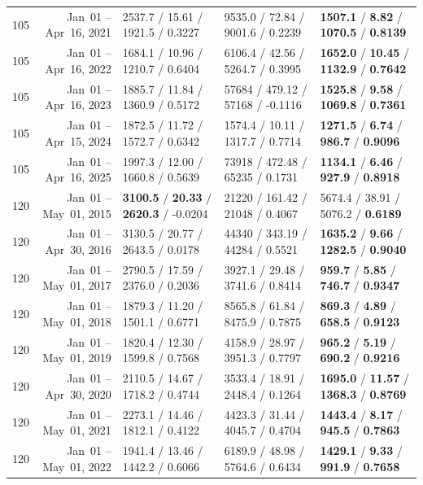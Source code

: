\begin{longtable}{r r l l l}
105 & Jan~01 -- Apr~16, 2021 & 2537.7 / 15.61 / 1921.5 / 0.3227 & 9535.0 / 72.84 / 9001.6 / 0.2239 & \textbf{1507.1} / \textbf{8.82} / \textbf{1070.5} / \textbf{0.8139} \\
105 & Jan~01 -- Apr~16, 2022 & 1684.1 / 10.96 / 1210.7 / 0.6404 & 6106.4 / 42.56 / 5264.7 / 0.3995 & \textbf{1652.0} / \textbf{10.45} / \textbf{1132.9} / \textbf{0.7642} \\
105 & Jan~01 -- Apr~16, 2023 & 1885.7 / 11.84 / 1360.9 / 0.5172 & 57684 / 479.12 / 57168 / -0.1116 & \textbf{1525.8} / \textbf{9.58} / \textbf{1069.8} / \textbf{0.7361} \\
105 & Jan~01 -- Apr~15, 2024 & 1872.5 / 11.72 / 1572.7 / 0.6342 & 1574.4 / 10.11 / 1317.7 / 0.7714 & \textbf{1271.5} / \textbf{6.74} / \textbf{986.7} / \textbf{0.9096} \\
105 & Jan~01 -- Apr~16, 2025 & 1997.3 / 12.00 / 1660.8 / 0.5639 & 73918 / 472.48 / 65235 / 0.1731 & \textbf{1134.1} / \textbf{6.46} / \textbf{927.9} / \textbf{0.8918} \\
\midrule
120 & Jan~01 -- May~01, 2015 & \textbf{3100.5} / \textbf{20.33} / \textbf{2620.3} / -0.0204 & 21220 / 161.42 / 21048 / 0.4067 & 5674.4 / 38.91 / 5076.2 / \textbf{0.6189} \\
120 & Jan~01 -- Apr~30, 2016 & 3130.5 / 20.77 / 2643.5 / 0.0178 & 44340 / 343.19 / 44284 / 0.5521 & \textbf{1635.2} / \textbf{9.66} / \textbf{1282.5} / \textbf{0.9040} \\
120 & Jan~01 -- May~01, 2017 & 2790.5 / 17.59 / 2376.0 / 0.2036 & 3927.1 / 29.48 / 3741.6 / 0.8414 & \textbf{959.7} / \textbf{5.85} / \textbf{746.7} / \textbf{0.9347} \\
120 & Jan~01 -- May~01, 2018 & 1879.3 / 11.20 / 1501.1 / 0.6771 & 8565.8 / 61.84 / 8475.9 / 0.7875 & \textbf{869.3} / \textbf{4.89} / \textbf{658.5} / \textbf{0.9123} \\
120 & Jan~01 -- May~01, 2019 & 1820.4 / 12.30 / 1599.8 / 0.7568 & 4158.9 / 28.97 / 3951.3 / 0.7797 & \textbf{965.2} / \textbf{5.19} / \textbf{690.2} / \textbf{0.9216} \\
120 & Jan~01 -- Apr~30, 2020 & 2110.5 / 14.67 / 1718.2 / 0.4744 & 3533.4 / 18.91 / 2448.4 / 0.1264 & \textbf{1695.0} / \textbf{11.57} / \textbf{1368.3} / \textbf{0.8769} \\
120 & Jan~01 -- May~01, 2021 & 2273.1 / 14.46 / 1812.1 / 0.4122 & 4423.3 / 31.44 / 4045.7 / 0.4704 & \textbf{1443.4} / \textbf{8.17} / \textbf{945.5} / \textbf{0.7863} \\
120 & Jan~01 -- May~01, 2022 & 1941.4 / 13.46 / 1442.2 / 0.6066 & 6189.9 / 48.98 / 5764.6 / 0.6434 & \textbf{1429.1} / \textbf{9.33} / \textbf{991.9} / \textbf{0.7658} \\

\end{longtable}
